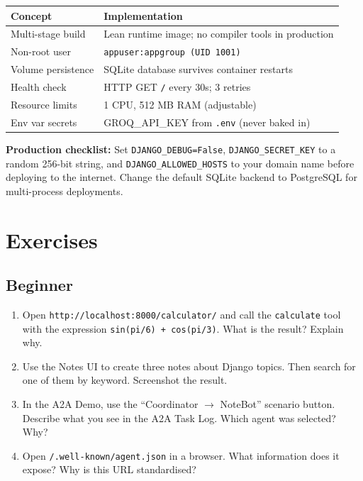 \documentclass[11pt,a4paper]{article}
\begin{document}
\begin{center}
\begin{tabularx}{\linewidth}{lX}
\toprule
\textbf{Concept} & \textbf{Implementation} \\
\midrule
Multi-stage build  & Lean runtime image; no compiler tools in production \\
Non-root user      & \texttt{appuser:appgroup (UID 1001)} \\
Volume persistence & SQLite database survives container restarts \\
Health check       & HTTP GET \texttt{/} every 30s; 3 retries \\
Resource limits    & 1 CPU, 512 MB RAM (adjustable) \\
Env var secrets    & GROQ\_API\_KEY from \texttt{.env} (never baked in) \\
\bottomrule
\end{tabularx}
\end{center}

\begin{warnbox}
\textbf{Production checklist:}
Set \texttt{DJANGO\_DEBUG=False}, \texttt{DJANGO\_SECRET\_KEY} to a random
256-bit string, and \texttt{DJANGO\_ALLOWED\_HOSTS} to your domain name before
deploying to the internet. Change the default SQLite backend to PostgreSQL
for multi-process deployments.
\end{warnbox}

\newpage
\section{Exercises}

\subsection{Beginner}

\begin{enumerate}[leftmargin=*, label=\textbf{B\arabic*.}]
  \item Open \texttt{http://localhost:8000/calculator/} and call the
        \texttt{calculate} tool with the expression
        \texttt{sin(pi/6) + cos(pi/3)}. What is the result? Explain why.

  \item Use the Notes UI to create three notes about Django topics.
        Then search for one of them by keyword. Screenshot the result.

  \item In the A2A Demo, use the ``Coordinator $\rightarrow$ NoteBot'' scenario button.
        Describe what you see in the A2A Task Log. Which agent was selected?
        Why?

  \item Open \texttt{/.well-known/agent.json} in a browser.
        What information does it expose? Why is this URL standardised?
\end{enumerate}
\end{document}
